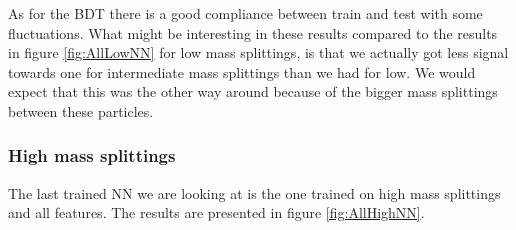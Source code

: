 As for the BDT there is a good compliance between train and test with some fluctuations. What might be interesting in these results compared to the results in figure \ref{fig:AllLowNN} for low mass splittings, is that we actually got less signal towards one for intermediate mass splittings than we had for low. We would expect that this was the other way around because of the bigger mass splittings between these particles.



















\subsubsection{High mass splittings}

The last trained NN we are looking at is the one trained on high mass splittings and all features. The results are presented in figure \ref{fig:AllHighNN}. 



